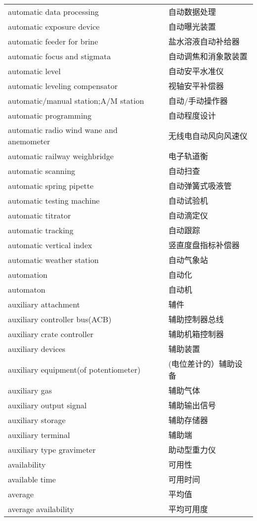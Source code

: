 \documentclass[
]{article}
\begin{document}
\begin{longtable}[]{@{}ll@{}}
automatic data processing & 自动数据处理 \\
automatic exposure device & 自动曝光装置 \\
automatic feeder for brine & 盐水溶液自动补给器 \\
automatic focus and stigmata & 自动调焦和消象散装置 \\
automatic level & 自动安平水准仪 \\
automatic leveling compensator & 视轴安平补偿器 \\
automatic/manual station;A/M station & 自动/手动操作器 \\
automatic programming & 自动程度设计 \\
automatic radio wind wane and anemometer & 无线电自动风向风速仪 \\
automatic railway weighbridge & 电子轨道衡 \\
automatic scanning & 自动扫查 \\
automatic spring pipette & 自动弹簧式吸液管 \\
automatic testing machine & 自动试验机 \\
automatic titrator & 自动滴定仪 \\
automatic tracking & 自动跟踪 \\
automatic vertical index & 竖直度盘指标补偿器 \\
automatic weather station & 自动气象站 \\
automation & 自动化 \\
automaton & 自动机 \\
auxiliary attachment & 辅件 \\
auxiliary controller bus(ACB) & 辅助控制器总线 \\
auxiliary crate controller & 辅助机箱控制器 \\
auxiliary devices & 辅助装置 \\
auxiliary equipment(of potentiometer) & (电位差计的）辅助设备 \\
auxiliary gas & 辅助气体 \\
auxiliary output signal & 辅助输出信号 \\
auxiliary storage & 辅助存储器 \\
auxiliary terminal & 辅助端 \\
auxiliary type gravimeter & 助动型重力仪 \\
availability & 可用性 \\
available time & 可用时间 \\
average & 平均值 \\
average availability & 平均可用度 \\

\end{longtable}
\end{document}
